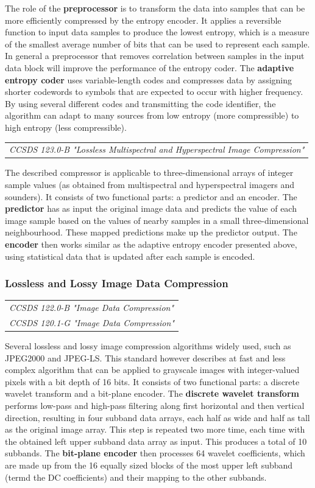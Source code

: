 The role of the \textbf{preprocessor} is to transform the data into samples that can be more efficiently compressed by the entropy encoder. It applies a reversible function to input data samples to produce the lowest entropy, which is a measure of the smallest average number of bits that can be used to represent each sample. In general a preprocessor that removes correlation between samples in the input data block will improve the performance of the entropy coder. The \textbf{adaptive entropy coder} uses variable-length codes and compresses data by assigning shorter codewords to symbols that are expected to occur with higher frequency. By using several different codes and transmitting the code identifier, the algorithm can adapt to many sources from low entropy (more compressible) to high entropy (less compressible).

\begin{tabular}{l}
\textit{CCSDS 123.0-B "Lossless Multispectral and Hyperspectral Image Compression" \cite{CCSDS-123.0-B}}
\end{tabular}

The described compressor is applicable to three-dimensional arrays of integer sample values (as obtained from multispectral and hyperspectral imagers and sounders). It consists of two functional parts: a predictor and an encoder. The \textbf{predictor} has as input the original image data and predicts the value of each image sample based on the values of nearby samples in a small three-dimensional neighbourhood. These mapped predictions make up the predictor output. The \textbf{encoder} then works similar as the adaptive entropy encoder presented above, using statistical data that is updated after each sample is encoded.

\subsubsection{Lossless and Lossy Image Data Compression}

\begin{tabular}{l}
\textit{CCSDS 122.0-B "Image Data Compression" \cite{CCSDS-122.0-B}} \\
\textit{CCSDS 120.1-G "Image Data Compression" \cite{CCSDS-120.1-G}}
\end{tabular}

Several lossless and lossy image compression algorithms widely used, such as JPEG2000 and JPEG-LS. This standard however describes at fast and less complex algorithm that can be applied to grayscale images with integer-valued pixels with a bit depth of 16 bits. It consists of two functional parts: a discrete wavelet transform and a bit-plane encoder. The \textbf{discrete wavelet transform} performs low-pass and high-pass filtering along first horizontal and then vertical direction, resulting in four subband data arrays, each half as wide and half as tall as the original image array. This step is repeated two more time, each time with the obtained left upper subband data array as input. This produces a total of 10 subbands. The \textbf{bit-plane encoder} then processes 64 wavelet coefficients, which are made up from the 16 equally sized blocks of the most upper left subband (termd the DC coefficients) and their mapping to the other subbands.

